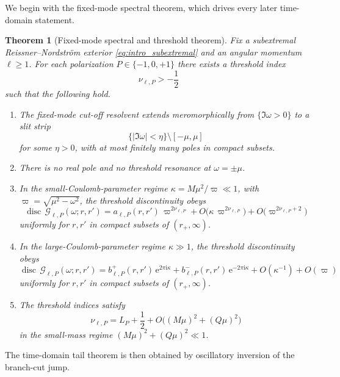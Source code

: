 \documentclass[12pt]{article}
\numberwithin{equation}{section}
\theoremstyle{plain}
\newtheorem{theorem}{Theorem}[section]
\theoremstyle{definition}
\theoremstyle{remark}
\newcommand{\ii}{\mathrm i}
\newcommand{\ee}{\mathrm e}
\newcommand{\disc}{\operatorname{disc}}
\newcommand{\cG}{\mathcal G}
\newcommand{\om}{\omega}
\newcommand{\vp}{\varpi}
\newcommand{\kap}{\kappa}
\newcommand{\abs}[1]{\left|#1\right|}
\begin{document}
We begin with the fixed-mode spectral theorem, which drives every later time-domain statement.

\begin{theorem}[Fixed-mode spectral and threshold theorem]\label{thm:spectral_package}
Fix a subextremal Reissner--Nordstr\"om exterior \eqref{eq:intro_subextremal} and an angular momentum $\ell\ge1$.  For each polarization $P\in\{-1,0,+1\}$ there exists a threshold index
\[
   \nu_{\ell,P}>-\frac12
\]
such that the following hold.
\begin{enumerate}[label=\textnormal{(\roman*)}]
   \item The fixed-mode cut-off resolvent extends meromorphically from $\{\Im\om>0\}$ to a slit strip
   \[
      \{\abs{\Im\om}<\eta\}\setminus[-\mu,\mu]
   \]
   for some $\eta>0$, with at most finitely many poles in compact subsets.
   \item There is no real pole and no threshold resonance at $\om=\pm\mu$.
   \item In the small-Coulomb-parameter regime $\kap=M\mu^2/\vp\ll1$, with $\vp=\sqrt{\mu^2-\om^2}$, the threshold discontinuity obeys
   \begin{equation}\label{eq:intro_small_kappa_general}
      \disc\,\cG_{\ell,P}(\om;r,r')
      =
      a_{\ell,P}(r,r')\,\vp^{2\nu_{\ell,P}}
      +O\!\bigl(\kap\,\vp^{2\nu_{\ell,P}}\bigr)
      +O\!\bigl(\vp^{2\nu_{\ell,P}+2}\bigr)
   \end{equation}
   uniformly for $r,r'$ in compact subsets of $(r_+,\infty)$.
   \item In the large-Coulomb-parameter regime $\kap\gg1$, the threshold discontinuity obeys
   \begin{equation}\label{eq:intro_large_kappa_general}
      \disc\,\cG_{\ell,P}(\om;r,r')
      =
      b^+_{\ell,P}(r,r')\,\ee^{2\pi\ii\kap}
      +b^-_{\ell,P}(r,r')\,\ee^{-2\pi\ii\kap}
      +O(\kap^{-1})+O(\vp)
   \end{equation}
   uniformly for $r,r'$ in compact subsets of $(r_+,\infty)$.
   \item The threshold indices satisfy
   \begin{equation}\label{eq:intro_nu_smallmass}
      \nu_{\ell,P}=L_P+\frac12+O\bigl((M\mu)^2+(Q\mu)^2\bigr)
   \end{equation}
   in the small-mass regime $(M\mu)^2+(Q\mu)^2\ll1$.
\end{enumerate}
\end{theorem}

The time-domain tail theorem is then obtained by oscillatory inversion of the branch-cut jump.
\end{document}
